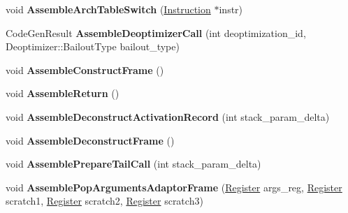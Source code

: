 \begin{DoxyCompactItemize}
\item 
void {\bfseries Assemble\+Arch\+Table\+Switch} (\hyperlink{classv8_1_1internal_1_1compiler_1_1_instruction}{Instruction} $\ast$instr)\hypertarget{classv8_1_1internal_1_1compiler_1_1_code_generator_a8f94af237bec5a7e5753aaa36655cb12}{}\label{classv8_1_1internal_1_1compiler_1_1_code_generator_a8f94af237bec5a7e5753aaa36655cb12}

\item 
Code\+Gen\+Result {\bfseries Assemble\+Deoptimizer\+Call} (int deoptimization\+\_\+id, Deoptimizer\+::\+Bailout\+Type bailout\+\_\+type)\hypertarget{classv8_1_1internal_1_1compiler_1_1_code_generator_a574b400a4d1086ccb2e8a1635a4112e9}{}\label{classv8_1_1internal_1_1compiler_1_1_code_generator_a574b400a4d1086ccb2e8a1635a4112e9}

\item 
void {\bfseries Assemble\+Construct\+Frame} ()\hypertarget{classv8_1_1internal_1_1compiler_1_1_code_generator_a1ddd37ac0513fd5f732c1e8d7572904a}{}\label{classv8_1_1internal_1_1compiler_1_1_code_generator_a1ddd37ac0513fd5f732c1e8d7572904a}

\item 
void {\bfseries Assemble\+Return} ()\hypertarget{classv8_1_1internal_1_1compiler_1_1_code_generator_a091d234375e7093f0cfc34cfcfd7c397}{}\label{classv8_1_1internal_1_1compiler_1_1_code_generator_a091d234375e7093f0cfc34cfcfd7c397}

\item 
void {\bfseries Assemble\+Deconstruct\+Activation\+Record} (int stack\+\_\+param\+\_\+delta)\hypertarget{classv8_1_1internal_1_1compiler_1_1_code_generator_aefa820c565cbee1bc4d45c8946370d7a}{}\label{classv8_1_1internal_1_1compiler_1_1_code_generator_aefa820c565cbee1bc4d45c8946370d7a}

\item 
void {\bfseries Assemble\+Deconstruct\+Frame} ()\hypertarget{classv8_1_1internal_1_1compiler_1_1_code_generator_a9a0cc749bc6dbeb1851f23059cfcb421}{}\label{classv8_1_1internal_1_1compiler_1_1_code_generator_a9a0cc749bc6dbeb1851f23059cfcb421}

\item 
void {\bfseries Assemble\+Prepare\+Tail\+Call} (int stack\+\_\+param\+\_\+delta)\hypertarget{classv8_1_1internal_1_1compiler_1_1_code_generator_ac1e2b60b10f1c3fb768dd4d91521e64a}{}\label{classv8_1_1internal_1_1compiler_1_1_code_generator_ac1e2b60b10f1c3fb768dd4d91521e64a}

\item 
void {\bfseries Assemble\+Pop\+Arguments\+Adaptor\+Frame} (\hyperlink{structv8_1_1internal_1_1_register}{Register} args\+\_\+reg, \hyperlink{structv8_1_1internal_1_1_register}{Register} scratch1, \hyperlink{structv8_1_1internal_1_1_register}{Register} scratch2, \hyperlink{structv8_1_1internal_1_1_register}{Register} scratch3)\hypertarget{classv8_1_1internal_1_1compiler_1_1_code_generator_a462d666b01c543e3d354bfaf664ea0c2}{}\label{classv8_1_1internal_1_1compiler_1_1_code_generator_a462d666b01c543e3d354bfaf664ea0c2}


\end{DoxyCompactItemize}
